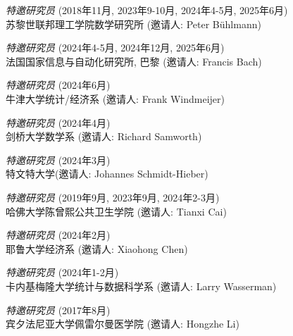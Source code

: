 \documentclass[margin, line]{res}
\begin{document}
\begin{resume}
        {\it 特邀研究员 } (2018年11月, 2023年9-10月, 2024年4-5月, 2025年6月)\\ 
        苏黎世联邦理工学院数学研究所  (邀请人: Peter B{\"u}hlmann)\\
        \vspace*{-6mm}

        {\it 特邀研究员 } (2024年4-5月, 2024年12月, 2025年6月)\\ 
        法国国家信息与自动化研究所, 巴黎  (邀请人: Francis Bach)\\
        \vspace*{-6mm}

        {\it 特邀研究员} (2024年6月)\\ 
        牛津大学统计/经济系  (邀请人: Frank Windmeijer)\\
        \vspace*{-6mm}

        {\it 特邀研究员} (2024年4月)\\ 
        剑桥大学数学系  (邀请人: Richard Samworth)\\
        \vspace*{-6mm}

        {\it 特邀研究员 } (2024年3月)\\ 
        特文特大学(邀请人: Johannes Schmidt-Hieber)\\
        \vspace*{-6mm}

        {\it 特邀研究员 } (2019年9月, 2023年9月, 2024年2-3月)\\ 
        哈佛大学陈曾熙公共卫生学院 (邀请人: Tianxi Cai)\\
        \vspace*{-6mm}

        {\it 特邀研究员} (2024年2月)\\ 
        耶鲁大学经济系  (邀请人: Xiaohong Chen)\\
        \vspace*{-6mm}

        {\it 特邀研究员 } (2024年1-2月)\\ 
        卡内基梅隆大学统计与数据科学系 (邀请人: Larry Wasserman)\\
        \vspace*{-6mm}

        {\it 特邀研究员} (2017年8月) \\ 
        宾夕法尼亚大学佩雷尔曼医学院  (邀请人: Hongzhe Li)\\

		\vspace*{-0mm}


\end{resume}
\end{document}
